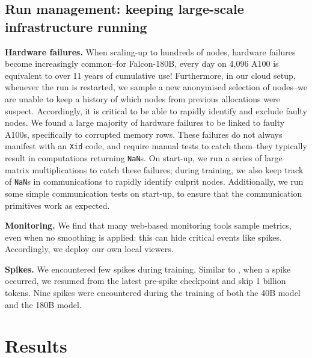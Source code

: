 \documentclass{article}
\begin{document}
\subsection{Run management: keeping large-scale infrastructure running}
\label{spikes}

\textbf{Hardware failures.} When scaling-up to hundreds of nodes, hardware failures become increasingly common--for Falcon-180B, every day on 4,096 A100 is equivalent to over 11 years of cumulative use! Furthermore, in our cloud setup, whenever the run is restarted, we sample a new anonymised selection of nodes--we are unable to keep a history of which nodes from previous allocations were suspect. Accordingly, it is critical to be able to rapidly identify and exclude faulty nodes. We found a large majority of hardware failures to be linked to faulty A100s, specifically to corrupted memory rows. These failures do not always manifest with an \texttt{Xid} code, and require manual tests to catch them--they typically result in computations returning \texttt{NaN}s. On start-up, we run a series of large matrix multiplications to catch these failures; during training, we also keep track of \texttt{NaN}s in communications to rapidly identify culprit nodes. Additionally, we run some simple communication tests on start-up, to ensure that the communication primitives work as expected.

\textbf{Monitoring.} We find that many web-based monitoring tools sample metrics, even when no smoothing is applied: this can hide critical events like spikes. Accordingly, we deploy our own local viewers.

\textbf{Spikes.} We encountered few spikes during training. Similar to \citet{palm}, when a spike occurred, we resumed from the latest pre-spike checkpoint and skip 1 billion tokens. Nine spikes were encountered during the training of both the 40B model and the 180B model.

\section{Results}
\label{sec:evaluation}
\end{document}
